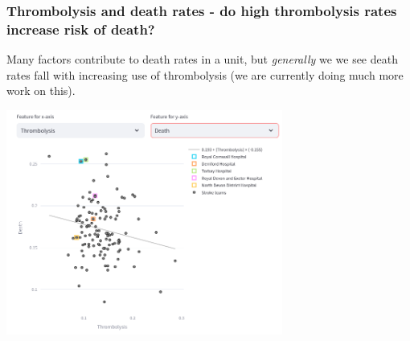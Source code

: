 \begin{frame}
\frametitle{Thrombolysis and death rates - do high thrombolysis rates increase risk of death?}

Many factors contribute to death rates in a unit, but \textit{generally} we we see death rates fall with increasing use of thrombolysis (we are currently doing much more work on this).

\begin{center}

\includegraphics[width=0.68\textwidth]{./Truro/thrombolysis_vs_death}
    
\end{center}

\end{frame}